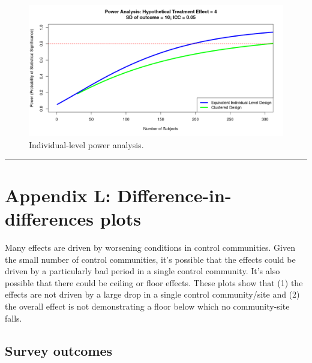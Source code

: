 \documentclass[
]{article}
\begin{document}
\begin{figure}[H]
\centering
\includegraphics[width=\linewidth]{../data_and_code/review/power_figure_ind.png}
\caption{Individual-level power analysis.}\label{fig:pow_ind}
\end{figure}

\begin{center}\rule{0.5\linewidth}{0.5pt}\end{center}

\newpage

\hypertarget{appendix-l-difference-in-differences-plots}{%
\section{Appendix L: Difference-in-differences
plots}\label{appendix-l-difference-in-differences-plots}}

Many effects are driven by worsening conditions in control communities.
Given the small number of control communities, it's possible that the
effects could be driven by a particularly bad period in a single control
community. It's also possible that there could be ceiling or floor
effects. These plots show that (1) the effects are not driven by a large
drop in a single control community/site and (2) the overall effect is
not demonstrating a floor below which no community-site falls.

\hypertarget{survey-outcomes-1}{%
\subsection{Survey outcomes}\label{survey-outcomes-1}}
\end{document}
